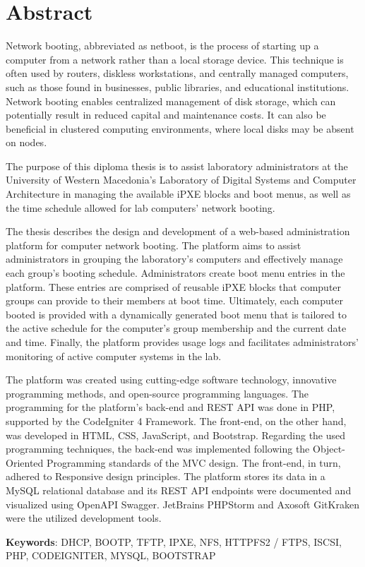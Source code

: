\chapter*{Abstract}
Network booting, abbreviated as netboot, is the process of starting up a computer from a network rather than a local storage device. This technique is often used by routers, diskless workstations, and centrally managed computers, such as those found in businesses, public libraries, and educational institutions. Network booting enables centralized management of disk storage, which can potentially result in reduced capital and maintenance costs. It can also be beneficial in clustered computing environments, where local disks may be absent on nodes.

The purpose of this diploma thesis is to assist laboratory administrators at the University of Western Macedonia's Laboratory of Digital Systems and Computer Architecture in managing the available iPXE blocks and boot menus, as well as the time schedule allowed for lab computers' network booting.

The thesis describes the design and development of a web-based administration platform for computer network booting. The platform aims to assist administrators in grouping the laboratory's computers and effectively manage each group's booting schedule. Administrators create boot menu entries in the platform. These entries are comprised of reusable iPXE blocks that computer groups can provide to their members at boot time. Ultimately, each computer booted is provided with a dynamically generated boot menu that is tailored to the active schedule for the computer's group membership and the current date and time. Finally, the platform provides usage logs and facilitates administrators' monitoring of active computer systems in the lab.

The platform was created using cutting-edge software technology, innovative programming methods, and open-source programming languages. The programming for the platform's back-end and REST API was done in PHP, supported by the CodeIgniter 4 Framework. The front-end, on the other hand, was developed in HTML, CSS, JavaScript, and Bootstrap. Regarding the used programming techniques, the back-end was implemented following the Object-Oriented Programming standards of the MVC design. The front-end, in turn, adhered to Responsive design principles. The platform stores its data in a MySQL relational database and its REST API endpoints were documented and visualized using OpenAPI Swagger. JetBrains PHPStorm and Axosoft GitKraken were the utilized development tools.

\vfill
\textbf{Keywords}: DHCP, BOOTP, TFTP, IPXE, NFS, HTTPFS2 / FTPS, ISCSI, PHP, CODEIGNITER, MYSQL, BOOTSTRAP
